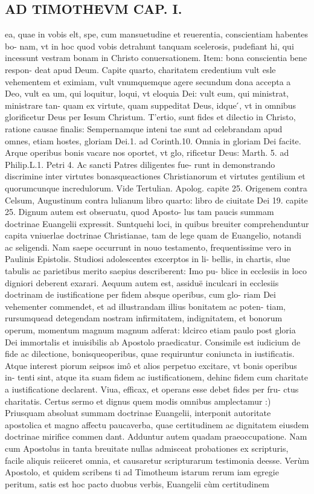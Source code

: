 \documentclass{article}
\begin{document}
\begin{pages}
\section*{AD TIMOTHEVM CAP. I. }
\marginpar{[ p.48 ]}\pstart ea, quae in vobis elt, spe, cum mansuetudine et reuerentia, conscientiam habentes bo-   nam, vt in hoc quod vobis detrahunt tanquam scelerosis, pudefiant hi, qui incessunt   vestram bonam in Christo conuersationem. Item: bona conscientia bene respon-   deat apud Deum. Capite quarto, charitatem credentium vult esle vehementem et eximiam, vult vnumquemque agere secundum dona accepta a Deo, vult ea um, qui loquitur, loqui, vt eloquia Dei: vult eum, qui ministrat, ministrare tan- quam ex virtute, quam suppeditat Deus, idque ́, vt in omnibus glorificetur Deus per Iesum Christum.  \pend\pstart T'ertio, sunt fides et dilectio in Christo, ratione causae finalis: Sempernamque  inteni tae sunt ad celebrandam apud omnes, etiam hostes, gloriam Dei.1. ad Corinth.10. Omnia in gloriam Dei facite. Arque operibus bonis vacare nos oportet, vt glo, rificetur Deus: Marth. 5. ad Philip.L.1. Petri 4. Ac sancti Patres diligentes fue- runt in demonstrando discrimine inter virtutes bonasqueactiones Christianorum et virtutes gentilium et quorumcunque incredulorum. Vide Tertulian. Apolog. capite 25. Origenem contra Celsum, Augustinum contra lulianum libro quarto: libro de ciuitate Dei 19. capite 25. Dignum autem est obseruatu, quod Aposto- lus tam paucis summam doctrinae Euangelii expressit. Suntquehi loci, in quibus breuiter comprehenduntur capita vniuerlae doctrinae Christianae, tam de lege quam de Euangelio, notandi ac seligendi. Nam saepe occurrunt in nouo testamento, frequentissime vero in Paulinis Epistolis. Studiosi adolescentes excerptos in li- bellis, in chartis, slue tabulis ac parietibus merito saepius describerent: Imo pu- blice in ecclesiis in loco digniori deberent exarari. Aequum autem est, assiduë inculcari in ecclesiis doctrinam de iustificatione per fidem absque  operibus, cum glo- riam Dei vehementer commendet, et ad illustrandam illius bonitatem ac poten- tiam, rursumquead detegendam nostram infirmitatem, indignitatem, et bonorum operum, momentum magnum magnum adferat: ldcirco etiam paulo post gloria Dei immortalis et inuisibilis ab Apostolo praedicatur. Consimile est iudicium de fide ac dilectione, bonisqueoperibus, quae requiruntur coniuncta in iustificatis. Atque  interest piorum seipsos imô et alios perpetuo excitare, vt bonis operibus in- tenti sint, atque ita suam fidem ac iustificationem, dehinc fidem cum charitate a iustificatione declarent. Viua, efficax, et operans esse debet fides per fru- ctus charitatis.  \pend\pstart Certus sermo et dignus quem modis omnibus amplectamur :) Priusquam absoluat summam doctrinae Euangelii, interponit autoritate apostolica et magno affectu paucaverba, quae certitudinem ac dignitatem eiusdem doctrinae mirifice commen dant. Adduntur autem quadam praeoccupatione. Nam cum Apostolus in tanta breuitate nullas admisceat probationes ex scripturis, facile aliquis reiiceret omnia, et causaretur scripturarum testimonia deesse. Verùm Apostolo, et quidem scribens ti ad Timotheum istarum rerum iam egregie peritum, satis est hoc pacto duobus verbis, Euangelii cùm certitudinem 
\end{pages}
\end{document}
